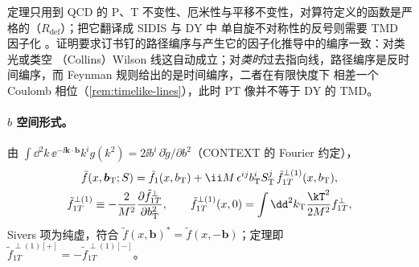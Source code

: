 \begin{remark}[地位与适用条件]
\label{rem:sivers-status}
定理只用到 QCD 的 P、T 不变性、厄米性与平移不变性，对算符定义的函数是严格的（$R_{\mathrm{def}}$）；把它翻译成 SIDIS 与 DY 中
单自旋不对称性的反号则需要 TMD 因子化 \tagA。证明要求订书钉的路径编序与产生它的因子化推导中的编序一致：对类光或类空
（Collins）Wilson 线这自动成立；对\emph{类时}过去指向线，路径编序是反时间编序，而 Feynman 规则给出的是时间编序，二者在有限快度下
相差一个 Coulomb 相位（\cref{rem:timelike-lines}），此时 PT 像并不等于 DY 的 TMD。
\end{remark}

\paragraph{$b$ 空间形式。}由 $\int\dd^2k\,\ee^{-\ii\boldsymbol k\cdot\boldsymbol b}k^ig(k^2)=2\ii b^i\,\partial\tilde g/\partial b^2$（CONTEXT 的 Fourier 约定），
\begin{equation}
  \begin{gathered}
  \tilde f(x,\boldsymbol b_{\mathrm T};S)=\tilde f_1(x,b_{\mathrm T})+\ii M\,\epsilon^{ij}b_{\mathrm T}^iS_{\mathrm T}^j\,\tilde f_{1T}^{\perp(1)}(x,b_{\mathrm T}),\\
  \tilde f_{1T}^{\perp(1)}\equiv-\frac{2}{M^2}\frac{\partial\tilde f_{1T}^\perp}{\partial b_{\mathrm T}^2},\qquad
  \tilde f_{1T}^{\perp(1)}(x,0)=\int\dd^2k_{\mathrm T}\frac{\kT^2}{2M^2}f_{1T}^\perp ,
  \end{gathered}
  \label{eq:sivers-bspace}
\end{equation}
Sivers 项为纯虚，符合 $\tilde f(x,\boldsymbol b)^*=\tilde f(x,-\boldsymbol b)$；定理即 $\tilde f_{1T}^{\perp(1)[+]}=-\tilde f_{1T}^{\perp(1)[-]}$。

